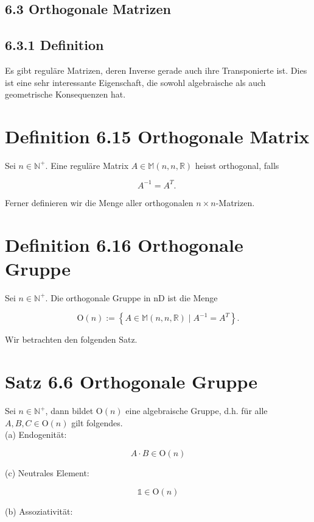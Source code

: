 \documentclass[10pt]{article}
\begin{document}
\subsection*{6.3 Orthogonale Matrizen}
\subsection*{6.3.1 Definition}
Es gibt reguläre Matrizen, deren Inverse gerade auch ihre Transponierte ist. Dies ist eine sehr interessante Eigenschaft, die sowohl algebraische als auch geometrische Konsequenzen hat.

\section*{Definition 6.15 Orthogonale Matrix}
Sei $n \in \mathbb{N}^{+}$. Eine reguläre Matrix $A \in \mathbb{M}(n, n, \mathbb{R})$ heisst orthogonal, falls


\begin{equation*}
A^{-1}=A^{T} \text {. } \tag{6.52}
\end{equation*}


Ferner definieren wir die Menge aller orthogonalen $n \times n$-Matrizen.

\section*{Definition 6.16 Orthogonale Gruppe}
Sei $n \in \mathbb{N}^{+}$. Die orthogonale Gruppe in nD ist die Menge


\begin{equation*}
\mathrm{O}(n):=\left\{A \in \mathbb{M}(n, n, \mathbb{R}) \mid A^{-1}=A^{T}\right\} . \tag{6.53}
\end{equation*}


Wir betrachten den folgenden Satz.

\section*{Satz 6.6 Orthogonale Gruppe}
Sei $n \in \mathbb{N}^{+}$, dann bildet $\mathrm{O}(n)$ eine algebraische Gruppe, d.h. für alle $A, B, C \in \mathrm{O}(n)$ gilt folgendes.\\
(a) Endogenität:

$$
A \cdot B \in \mathrm{O}(n)
$$

(c) Neutrales Element:

$$
\mathbb{1} \in \mathrm{O}(n)
$$

(b) Assoziativität:
\end{document}
